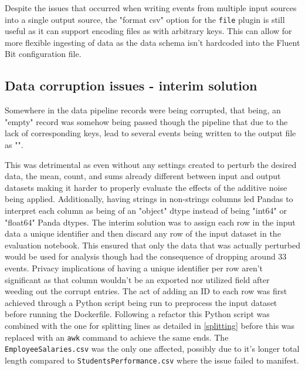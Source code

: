 

Despite the issues that occurred when writing events from multiple input sources into a single output source, the "format csv" option for the \texttt{file} plugin is still useful as it can support encoding files as with arbitrary keys. This can allow for more flexible ingesting of data as the data schema isn't hardcoded into the Fluent Bit configuration file.

\subsection{Data corruption issues - interim solution}
Somewhere in the data pipeline records were being corrupted, that being, an "empty" record was somehow being passed though the pipeline that due to the lack of corresponding keys, lead to several events being written to the output file as "\texttt{}".

This was detrimental as even without any settings created to perturb the desired data, the mean, count, and sums already different between input and output datasets making it harder to properly evaluate the effects of the additive noise being applied. Additionally, having strings in non-strings columns led Pandas to interpret each column as being of an "object" dtype instead of being "int64" or "float64" Panda dtypes. The interim solution was to assign each row in the input data a unique identifier and then discard any row of the input dataset in the evaluation notebook. This ensured that only the data that was actually perturbed would be used for analysis though had the consequence of dropping around 33 events. Privacy implications of having a unique identifier per row aren't significant as that column wouldn't be an exported nor utilized field after weeding out the corrupt entries. The act of adding an ID to each row was first achieved through a Python script being run to preprocess the input dataset before running the Dockerfile. Following a refactor this Python script was combined with the one for splitting lines as detailed in \ref{splitting} before this was replaced with an \texttt{awk} command to achieve the same ends. The \texttt{EmployeeSalaries.csv} was the only one affected, possibly due to it's longer total length compared to \texttt{StudentsPerformance.csv} where the issue failed to manifest.

